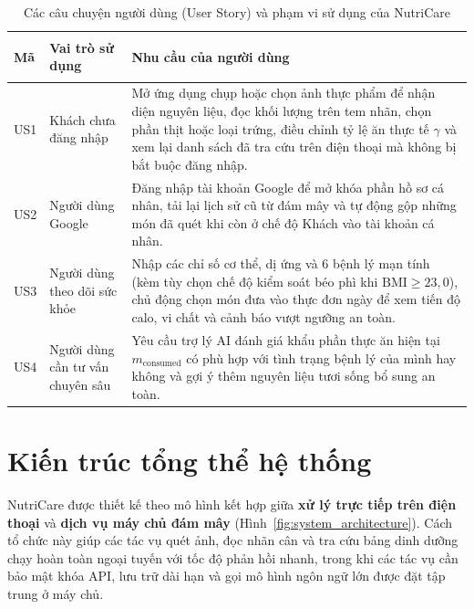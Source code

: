\begin{table}[htbp]
    \centering
    \caption{Các câu chuyện người dùng (User Story) và phạm vi sử dụng của NutriCare}
    \label{tab:user-stories}
    \begingroup
    \small
    \setlength{\tabcolsep}{5pt}
    \renewcommand{\arraystretch}{1.22}
    \begin{tabularx}{\textwidth}{@{}>{\bfseries\raggedright\arraybackslash}p{1.3cm}>{\raggedright\arraybackslash}p{2.9cm}X@{}}
        \toprule
        Mã & Vai trò sử dụng & Nhu cầu của người dùng \\
        \midrule
        US1 & Khách chưa đăng nhập & Mở ứng dụng chụp hoặc chọn ảnh thực phẩm để nhận diện nguyên liệu, đọc khối lượng trên tem nhãn, chọn phần thịt hoặc loại trứng, điều chỉnh tỷ lệ ăn thực tế $\gamma$ và xem lại danh sách đã tra cứu trên điện thoại mà không bị bắt buộc đăng nhập. \\
        US2 & Người dùng Google & Đăng nhập tài khoản Google để mở khóa phần hồ sơ cá nhân, tải lại lịch sử cũ từ đám mây và tự động gộp những món đã quét khi còn ở chế độ Khách vào tài khoản cá nhân. \\
        US3 & Người dùng theo dõi sức khỏe & Nhập các chỉ số cơ thể, dị ứng và 6 bệnh lý mạn tính (kèm tùy chọn chế độ kiểm soát béo phì khi $\mathrm{BMI} \ge 23{,}0$), chủ động chọn món đưa vào thực đơn ngày để xem tiến độ calo, vi chất và cảnh báo vượt ngưỡng an toàn. \\
        US4 & Người dùng cần tư vấn chuyên sâu & Yêu cầu trợ lý AI đánh giá khẩu phần thực ăn hiện tại $m_{\text{consumed}}$ có phù hợp với tình trạng bệnh lý của mình hay không và gợi ý thêm nguyên liệu tươi sống bổ sung an toàn. \\
        \bottomrule
    \end{tabularx}
    \endgroup
\end{table}

\section{Kiến trúc tổng thể hệ thống}
\label{sec:system-architecture}

NutriCare được thiết kế theo mô hình kết hợp giữa \textbf{xử lý trực tiếp trên điện thoại} và \textbf{dịch vụ máy chủ đám mây} (Hình~\ref{fig:system_architecture}). Cách tổ chức này giúp các tác vụ quét ảnh, đọc nhãn cân và tra cứu bảng dinh dưỡng chạy hoàn toàn ngoại tuyến với tốc độ phản hồi nhanh, trong khi các tác vụ cần bảo mật khóa API, lưu trữ dài hạn và gọi mô hình ngôn ngữ lớn được đặt tập trung ở máy chủ.

